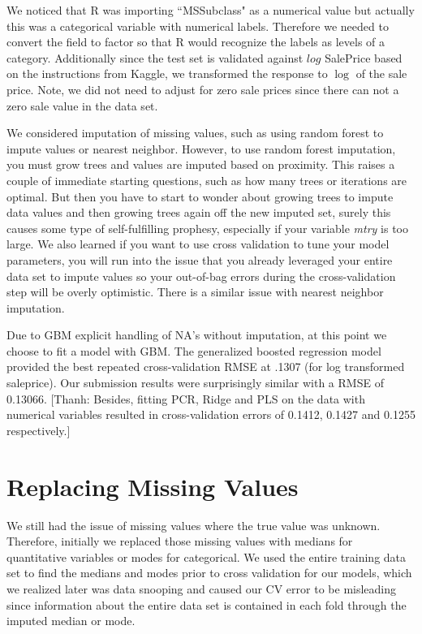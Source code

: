 \documentclass[12pt]{article}
\newcommand{\thanh}[1]{{\color{blue} [Thanh: #1]}}
\begin{document}
We noticed that R was importing ``MSSubclass" as a numerical value but actually this was a categorical variable with numerical labels.  Therefore we needed to convert the field to factor so that R would recognize the labels as levels of a category.  Additionally since the test set is validated against $log$ SalePrice based on the instructions from Kaggle, we transformed the response to $\log$ of the sale price.  Note,  we did not need to adjust for zero sale prices since there can not a zero sale value in the data set.

We considered imputation of missing values, such as using random forest to impute values or nearest neighbor.  However, to use random forest imputation, you must grow trees and values are imputed based on proximity. This raises a couple of immediate starting questions, such as how many trees or iterations are optimal.  But then you have to start to wonder about growing trees to impute data values and then growing trees again off the new imputed set, surely this causes some type of self-fulfilling prophesy, especially if your variable \emph{mtry} is too large. We also learned if you want to use cross validation to tune your model parameters, you will run into the issue that you already leveraged your entire data set to impute values so your out-of-bag errors during the cross-validation step will be overly optimistic.  There is a similar issue with nearest neighbor imputation.

Due to GBM explicit handling of NA's without imputation, at this point we choose to fit a model with GBM.  The generalized boosted regression model provided the best repeated cross-validation RMSE at .1307 (for log transformed saleprice). Our submission results were surprisingly similar with a RMSE of 0.13066. %
\thanh{Besides, fitting PCR, Ridge and PLS on the data with numerical variables resulted in cross-validation errors of 0.1412, 0.1427 and 0.1255 respectively.}

\section{Replacing Missing Values}

We still had the issue of missing values where the true value was unknown. Therefore, initially we replaced those missing values with medians for quantitative variables or modes for categorical. We used the entire training data set to find the medians and modes prior to cross validation for our models, which we realized later was data snooping and caused our CV error to be misleading since information about the entire data set is contained in each fold through the imputed median or mode.
\end{document}

